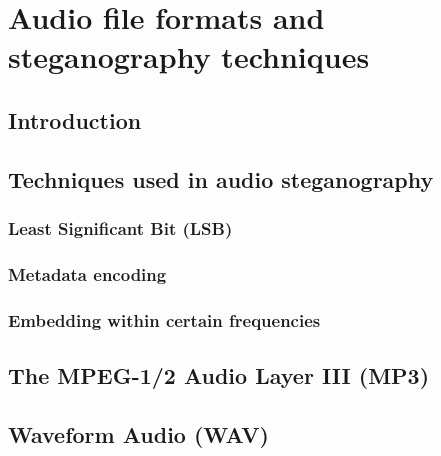 
\chapter{Audio file formats and steganography techniques}

\section{Introduction}

\section{Techniques used in audio steganography}
\subsection{Least Significant Bit (LSB)}
\subsection{Metadata encoding}
\subsection{Embedding within certain frequencies}

\section{The MPEG-1/2 Audio Layer III (MP3)}

\section{Waveform Audio (WAV)}